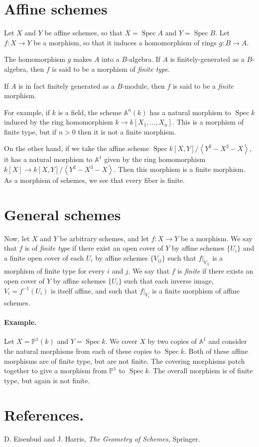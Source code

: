 \documentclass[12pt]{article}
\DeclareMathOperator{\Spec}{Spec}
\begin{document}
\section*{Affine schemes}
Let $X$ and $Y$ be affine schemes, so that $X=\Spec A$ and $Y=\Spec
B$. Let $f\colon X\to Y$ be a morphism, so that it induces a
homomorphism of rings $g\colon B\to A$.

The homomorphism $g$ makes $A$ into a $B$-algebra. If $A$ is
finitely-generated as a $B$-algebra, then $f$ is said to be a morphism
of \emph{finite type}.

If $A$ is in fact finitely generated as a $B$-module, then $f$ is said
to be a \emph{finite} morphism.

For example, if $k$ is a field, the scheme $\mathbb{A}^n(k)$ has a
natural morphism to $\Spec k$ induced by the ring homomorphism $k \to
k[X_1,\ldots,X_n]$. This is a morphism of finite type, but if $n>0$
then it is not a finite morphism.

On the other hand, if we take the affine scheme $\Spec
k[X,Y]/\left<Y^2-X^3-X\right>$, it has a natural morphism to
$\mathbb{A}^1$ given by the ring homomorphism $k[X]\to
k[X,Y]/\left<Y^2-X^3-X\right>$. Then this morphism is a finite
morphism. As a morphism of schemes, we see that every fiber is finite.

\section*{General schemes}
Now, let $X$ and $Y$ be arbitrary schemes, and let $f \colon X\to Y$
be a morphism.  We say that $f$ is of \emph{finite type} if there exist an
open cover of $Y$ by affine schemes  $\{U_i\}$ and a finite open cover
of each $U_i$ by affine schemes $\{V_{ij}\}$ such that $f|_{V_{ij}}$
is a morphism of finite type for every $i$ and $j$.  We say that $f$
is \emph{finite} if there exists an open cover of $Y$ by affine
schemes $\{U_i\}$ such that each inverse image, $V_i=f^{-1}(U_i)$ is
itself affine, and such that $f|_{V_i}$ is a finite morphism of affine
schemes. 


\paragraph{Example.} Let $X=\mathbb{P}^1(k)$ and $Y=\Spec k$. 
We cover $X$ by two copies of $\mathbb{A}^1$ and consider the natural
morphisms from each of these copies to $\Spec k$.  Both of these
affine morphisms are of finite type, but are not finite. The covering
morphisms patch together to give a morphism from $\mathbb{P}^1$ to
$\Spec k$. The overall morphism is of finite type, but again is not
finite.

\section*{References.}
D. Eisenbud and J. Harris, \textit{The Geometry of Schemes}, Springer.
\end{document}
